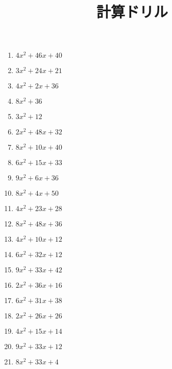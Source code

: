 \documentclass[9pt,dvipdfmx,a4paper]{article}
\begin{document}
    
\title{計算ドリル} 
\date{} 
\maketitle
\begin{multicols}{2}
 \begin{enumerate}

\item
$ 4 x^{2} + 46 x + 40$

\item
$ 3 x^{2} + 24 x + 21$

\item
$ 4 x^{2} + 2 x + 36$

\item
$ 8 x^{2} + 36$

\item
$ 3 x^{2} + 12$

\item
$ 2 x^{2} + 48 x + 32$

\item
$ 8 x^{2} + 10 x + 40$

\item
$ 6 x^{2} + 15 x + 33$

\item
$ 9 x^{2} + 6 x + 36$

\item
$ 8 x^{2} + 4 x + 50$

\item
$ 4 x^{2} + 23 x + 28$

\item
$ 8 x^{2} + 48 x + 36$

\item
$ 4 x^{2} + 10 x + 12$

\item
$ 6 x^{2} + 32 x + 12$

\item
$ 9 x^{2} + 33 x + 42$

\item
$ 2 x^{2} + 36 x + 16$

\item
$ 6 x^{2} + 31 x + 38$

\item
$ 2 x^{2} + 26 x + 26$

\item
$ 4 x^{2} + 15 x + 14$

\item
$ 9 x^{2} + 33 x + 12$

\item
$ 8 x^{2} + 33 x + 4$


\end{enumerate}
\end{multicols}
\end{document}
